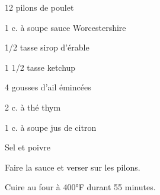 %
%   
%   
%   
%




\totaltime{}


\begin{ingredients}
    \item 12 pilons de poulet
    \item 1 c. à soupe sauce Worcestershire
    \item 1/2 tasse sirop d'érable
    \item 1 1/2 tasse ketchup
    \item 4 gousses d'ail émincées
    \item 2 c. à thé thym
    \item 1 c. à soupe jus de citron
    \item Sel et poivre
\end{ingredients}

\begin{steps}
    \item Faire la sauce et verser sur les pilons.
    \item Cuire au four à 400°F durant 55 minutes.
\end{steps}
